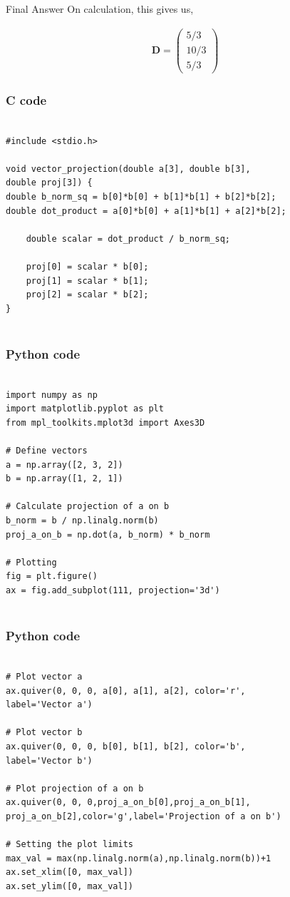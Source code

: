 \documentclass{beamer}
\theoremstyle{remark}
\newcommand{\myvec}[1]{\ensuremath{\begin{pmatrix}#1\end{pmatrix}}}
\begin{document}
\begin{frame}{Final Answer}
    On calculation, this gives us,

\begin{align}
    \textbf{D} = \myvec{5/3\\10/3\\5/3}
    \label{0.6}
\end{align}
\end{frame}

\begin{frame}[fragile]
\frametitle{C code}
\begin{lstlisting}

#include <stdio.h>

void vector_projection(double a[3], double b[3],
double proj[3]) {
double b_norm_sq = b[0]*b[0] + b[1]*b[1] + b[2]*b[2];
double dot_product = a[0]*b[0] + a[1]*b[1] + a[2]*b[2];

    double scalar = dot_product / b_norm_sq;

    proj[0] = scalar * b[0];
    proj[1] = scalar * b[1];
    proj[2] = scalar * b[2];
}


\end{lstlisting}
\end{frame}

\begin{frame}[fragile]
\frametitle{Python code}
\begin{lstlisting}

import numpy as np
import matplotlib.pyplot as plt
from mpl_toolkits.mplot3d import Axes3D

# Define vectors
a = np.array([2, 3, 2])
b = np.array([1, 2, 1])

# Calculate projection of a on b
b_norm = b / np.linalg.norm(b)
proj_a_on_b = np.dot(a, b_norm) * b_norm

# Plotting
fig = plt.figure()
ax = fig.add_subplot(111, projection='3d')


\end{lstlisting}
\end{frame}


\begin{frame}[fragile]
\frametitle{Python code}
\begin{lstlisting}

# Plot vector a
ax.quiver(0, 0, 0, a[0], a[1], a[2], color='r', 
label='Vector a')

# Plot vector b
ax.quiver(0, 0, 0, b[0], b[1], b[2], color='b', 
label='Vector b')

# Plot projection of a on b
ax.quiver(0, 0, 0,proj_a_on_b[0],proj_a_on_b[1],
proj_a_on_b[2],color='g',label='Projection of a on b')

# Setting the plot limits
max_val = max(np.linalg.norm(a),np.linalg.norm(b))+1
ax.set_xlim([0, max_val])
ax.set_ylim([0, max_val])

\end{lstlisting}
\end{frame}
\end{document}
